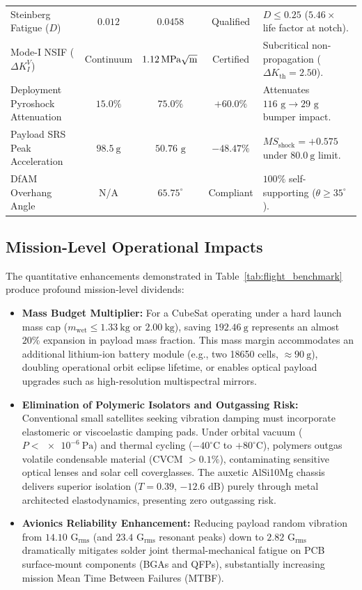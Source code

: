 \begin{table}[htbp]
\begin{tabularx}{\textwidth}{l c c c >{\raggedright\arraybackslash}X}
Steinberg Fatigue ($D$) & $0.012$ & $\mathbf{0.0458}$ & Qualified & $D \le 0.25$ ($5.46\times$ life factor at notch). \\
Mode-I NSIF ($\Delta K_I^V$) & Continuum & $\SI{1.12}{\mega\pascal\sqrt{\meter}}$ & Certified & Subcritical non-propagation ($\Delta K_{\text{th}} = 2.50$). \\
Deployment Pyroshock Attenuation & $15.0\%$ & $\mathbf{75.0\%}$ & $+60.0\%$ & Attenuates $116\text{ g} \to 29\text{ g}$ bumper impact. \\
Payload SRS Peak Acceleration & $\SI{98.5}{\text{g}}$ & $\mathbf{50.76}{\text{ g}}$ & $-48.47\%$ & $MS_{\text{shock}} = +0.575$ under $\SI{80.0}{\text{g}}$ limit. \\
DfAM Overhang Angle & N/A & $65.75^\circ$ & Compliant & $100\%$ self-supporting ($\theta \ge 35^\circ$). \\
\bottomrule
\end{tabularx}
\end{table}

\subsection{Mission-Level Operational Impacts}

The quantitative enhancements demonstrated in Table~\ref{tab:flight_benchmark} produce profound mission-level dividends:
\begin{itemize}
\item \textbf{Mass Budget Multiplier:} For a CubeSat operating under a hard launch mass cap ($m_{\text{wet}} \le \SI{1.33}{\kilo\gram}$ or $\SI{2.00}{\kilo\gram}$), saving $\SI{192.46}{\gram}$ represents an almost $20\%$ expansion in payload mass fraction. This mass margin accommodates an additional lithium-ion battery module (e.g., two 18650 cells, $\approx \SI{90}{\gram}$), doubling operational orbit eclipse lifetime, or enables optical payload upgrades such as high-resolution multispectral mirrors.
\item \textbf{Elimination of Polymeric Isolators and Outgassing Risk:} Conventional small satellites seeking vibration damping must incorporate elastomeric or viscoelastic damping pads. Under orbital vacuum ($P < \SI{e-6}{\pascal}$) and thermal cycling ($-40^\circ\text{C}$ to $+80^\circ\text{C}$), polymers outgas volatile condensable material (CVCM $> 0.1\%$), contaminating sensitive optical lenses and solar cell coverglasses. The auxetic AlSi10Mg chassis delivers superior isolation ($T = 0.39$, $-12.6\text{ dB}$) purely through metal architected elastodynamics, presenting zero outgassing risk.
\item \textbf{Avionics Reliability Enhancement:} Reducing payload random vibration from $14.10\text{ G}_{\text{rms}}$ (and $23.4\text{ G}_{\text{rms}}$ resonant peaks) down to $2.82\text{ G}_{\text{rms}}$ dramatically mitigates solder joint thermal-mechanical fatigue on PCB surface-mount components (BGAs and QFPs), substantially increasing mission Mean Time Between Failures (MTBF).
\end{itemize}

